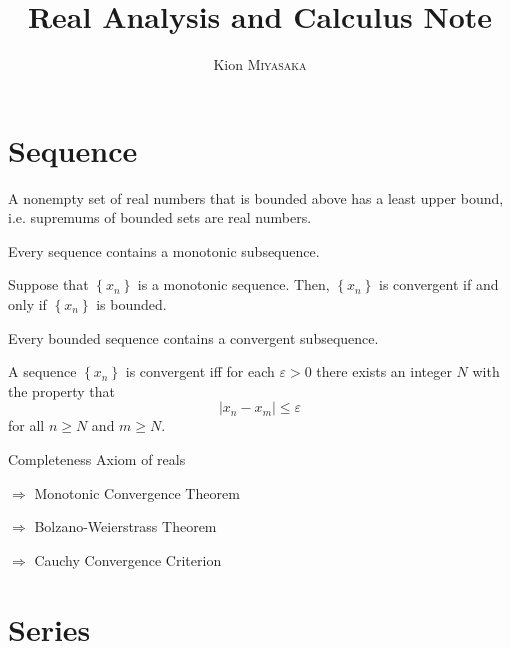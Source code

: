 \documentclass[11pt]{article}
\title{\huge \bfseries Real  Analysis and Calculus Note}
\author{Kion \textsc{Miyasaka}}
\def\bm#1{\textbf{#1}}
\begin{document}
\maketitle

\section{Sequence}

\begin{tcolorbox}[colback=blue!5,colframe=black!5!red,title=\bm{Axiom of Completeness}]
	A nonempty set of real numbers that is bounded above has a least upper bound, i.e. supremums of bounded sets are real numbers.
\end{tcolorbox}


\begin{tcolorbox}[colback=blue!5,colframe=black!75!green,title=\bm{Monotone Subsequence}]
	Every sequence contains a monotonic subsequence.
	\begin{tcolorbox}[colback=blue!5,colframe=black!75!black,title=\bm{Monotone Convergence Theorem}]
	Suppose that $\left\{x_{n}\right\}$ is a monotonic sequence. Then, $\left\{x_{n}\right\}$ is convergent if and only if $\left\{x_{n}\right\}$ is bounded.
\end{tcolorbox}

\end{tcolorbox}


\begin{tcolorbox}[colback=blue!5,colframe=black!75!black,title=\bm{Bolzano-Weierstrass}]
Every bounded sequence contains a convergent subsequence.
\end{tcolorbox}
 
 \begin{tcolorbox}[colback=blue!5,colframe=black!75!black,title=\bm{Cauchy Convergence Criterion}]
 A sequence $\left\{x_{n}\right\}$ is convergent iff for each $\varepsilon>0$ there exists an integer $N$ with the property that
$$
\left|x_{n}-x_{m}\right| \leq \varepsilon
$$
for all $n \geq N$ and $m \geq N$.	
 \end{tcolorbox}
 
 \qquad Completeness Axiom of reals
 
$\Longrightarrow$ Monotonic Convergence Theorem

$\Longrightarrow$ Bolzano-Weierstrass Theorem

$\Longrightarrow$ Cauchy Convergence Criterion


\newpage
\section{Series}
\end{document}
